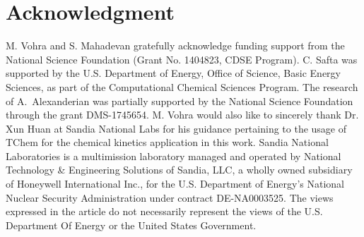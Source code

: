 \section*{Acknowledgment}

M. Vohra and S. Mahadevan gratefully acknowledge funding support from the
National Science Foundation (Grant No. 1404823, CDSE Program). 
C. Safta was supported by the U.S. Department of Energy, Office of Science,
Basic Energy Sciences, as part of the Computational Chemical Sciences Program.
The research of A.~Alexanderian was partially supported by the National 
Science Foundation through the grant DMS-1745654.
M. Vohra would also like to sincerely thank Dr. Xun Huan at Sandia National Labs for
his guidance pertaining to the usage of TChem for the chemical kinetics application
in this work. Sandia National Laboratories is a multimission laboratory managed 
and operated by National Technology \& Engineering Solutions of Sandia, LLC, 
a wholly owned subsidiary of Honeywell International Inc., for the 
U.S. Department of Energy's National Nuclear Security Administration under contract DE-NA0003525. 
The views expressed in the article do not necessarily represent the
views of the U.S. Department Of Energy or the United States Government.
